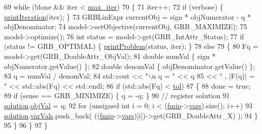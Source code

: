 \begin{DoxyCode}
69   \textcolor{keywordflow}{while} (!done && iter < \hyperlink{classgrbfrc_1_1Dinkelbach_a732fd0c62a20a624dbd5d9ab95f5d9c7}{max\_iter})
70    \{
71     iter++;
72     \textcolor{keywordflow}{if} (verbose) \{ \hyperlink{classgrbfrc_1_1Dinkelbach_a761608ae16a7e037e2b2e6a0dd096697}{printIteration}(iter); \}
73     GRBLinExpr currentObj = sign * objNumerator - q * objDenominator;
74     model->setObjective(currentObj, GRB\_MAXIMIZE);
75     model->optimize();
76     \textcolor{keywordtype}{int} status = model->get(GRB\_IntAttr\_Status);
77     \textcolor{keywordflow}{if} (status != GRB\_OPTIMAL) \{ \hyperlink{classgrbfrc_1_1Dinkelbach_a37136d7a62a3b8b5b480788750fcb5e3}{printProblem}(status, iter); \}
78     \textcolor{keywordflow}{else}
79      \{
80       Fq = model->get(GRB\_DoubleAttr\_ObjVal);
81       \textcolor{keywordtype}{double} numVal \{ sign * objNumerator.getValue() \};
82       \textcolor{keywordtype}{double} denomVal \{ objDenominator.getValue() \};
83       q = numVal / denomVal;
84       std::cout << \textcolor{stringliteral}{"\(\backslash\)n     q = "} << q
85                 << \textcolor{stringliteral}{" ,  |F(q)| = "} << std::abs(Fq) << std::endl;
86       \textcolor{keywordflow}{if} (std::abs(Fq) < \hyperlink{classgrbfrc_1_1Dinkelbach_aa14d02fd3f14975d9ef118b18dfb5d87}{tol})
87        \{
88         done = \textcolor{keyword}{true};
89         \textcolor{keywordflow}{if} (sense == GRB\_MINIMIZE) \{ q = -q; \}
90         \textcolor{comment}{// register solution}
91         \hyperlink{classgrbfrc_1_1Dinkelbach_a2b704289f15a68055ac48167119cc69e}{solution}.\hyperlink{structgrbfrc_1_1FMILPSol_a63fec0e4c5df880215f3de25e8605505}{objVal} = q;
92         \textcolor{keywordflow}{for} (\textcolor{keywordtype}{unsigned} \textcolor{keywordtype}{int} i = 0; i < (\hyperlink{classgrbfrc_1_1Dinkelbach_aa7b46a3cb24f1ec0f278edaa2348729d}{fmip}->\hyperlink{classgrbfrc_1_1FMILP_acbf6866651d8b8b18c094302cf2a4284}{vars}).size(); i++)
93           \hyperlink{classgrbfrc_1_1Dinkelbach_a2b704289f15a68055ac48167119cc69e}{solution}.\hyperlink{structgrbfrc_1_1FMILPSol_a36afbb370bb174c488c46b882c0c9bbf}{varVals}.push\_back( ((\hyperlink{classgrbfrc_1_1Dinkelbach_aa7b46a3cb24f1ec0f278edaa2348729d}{fmip}->\hyperlink{classgrbfrc_1_1FMILP_acbf6866651d8b8b18c094302cf2a4284}{vars})[i])->get(GRB\_DoubleAttr\_X) );
94        \}
95      \}
96    \}
97  \}
\end{DoxyCode}


